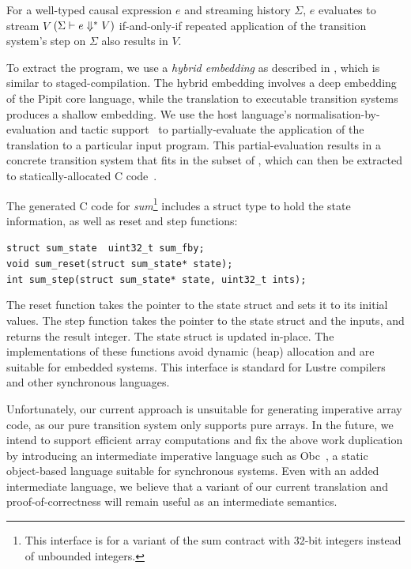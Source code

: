 \documentclass[a4paper,UKenglish,cleveref, autoref, thm-restate,anonymous]{lipics-v2021}
\begin{document}
\begin{theorem}
  For a well-typed causal expression $e$ and streaming history $\Sigma$, $e$ evaluates to stream $V$ $(\Sigma \vdash e \Downarrow^{*} V)$ if-and-only-if repeated application of the transition system's step on $\Sigma$ also results in $V$.
\end{theorem}

To extract the program, we use a \emph{hybrid embedding} as described in \cite{ho2022noise}, which is similar to staged-compilation.
The hybrid embedding involves a deep embedding of the Pipit core language, while the translation to executable transition systems produces a shallow embedding.
We use the \fstar{} host language's normalisation-by-evaluation and tactic support~\cite{martinez2019meta} to partially-evaluate the application of the translation to a particular input program.
This partial-evaluation results in a concrete transition system that fits in the \lowstar{} subset of \fstar{}, which can then be extracted to statically-allocated C code~\cite{protzenko2017verified}.

The generated C code for \emph{sum}\footnote{This interface is for a variant of the sum contract with 32-bit integers instead of unbounded integers.} includes a struct type to hold the state information, as well as reset and step functions:
  \begin{tabbing}
    \tt{struct sum_state { uint32_t sum_fby; }} \\
    \tt{void   sum_reset(struct sum_state* state);} \\
    \tt{int    sum_step(struct sum_state* state, uint32_t ints);}
  \end{tabbing}

The reset function takes the pointer to the state struct and sets it to its initial values.
The step function takes the pointer to the state struct and the inputs, and returns the result integer.
The state struct is updated in-place.
The implementations of these functions avoid dynamic (heap) allocation and are suitable for embedded systems.
This interface is standard for Lustre compilers~\cite{bourke2017formally,gerard2012modular} and other synchronous languages.

Unfortunately, our current approach is unsuitable for generating imperative array code, as our pure transition system only supports pure arrays.
In the future, we intend to support efficient array computations and fix the above work duplication by introducing an intermediate imperative language such as Obc~\cite{biernacki2008clock}, a static object-based language suitable for synchronous systems.
Even with an added intermediate language, we believe that a variant of our current translation and proof-of-correctness will remain useful as an intermediate semantics.
 
\end{document}
